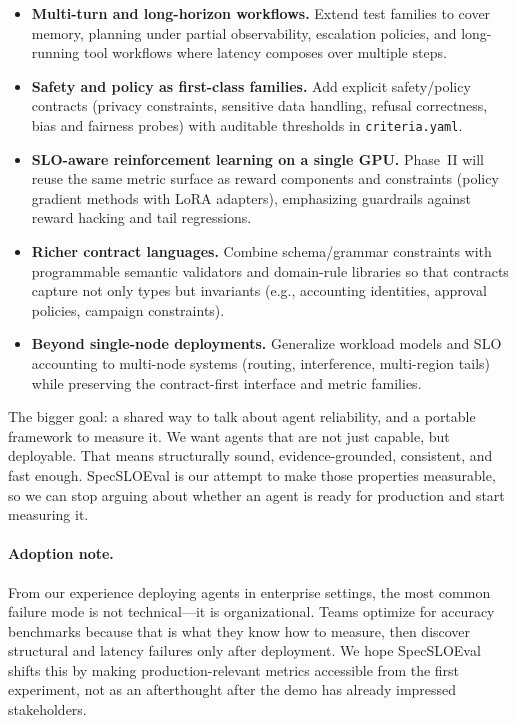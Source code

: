 \documentclass[11pt]{article}
\begin{document}
\begin{itemize}[leftmargin=12pt]
    \item \textbf{Multi-turn and long-horizon workflows.}
    Extend test families to cover memory, planning under partial observability, escalation policies, and long-running tool workflows where latency composes over multiple steps.

    \item \textbf{Safety and policy as first-class families.}
    Add explicit safety/policy contracts (privacy constraints, sensitive data handling, refusal correctness, bias and fairness probes) with auditable thresholds in \texttt{criteria.yaml}.

    \item \textbf{SLO-aware reinforcement learning on a single GPU.}
    Phase~II will reuse the same metric surface as reward components and constraints (policy gradient methods with LoRA adapters), emphasizing guardrails against reward hacking and tail regressions.

    \item \textbf{Richer contract languages.}
    Combine schema/grammar constraints with programmable semantic validators and domain-rule libraries so that contracts capture not only types but invariants (e.g., accounting identities, approval policies, campaign constraints).

    \item \textbf{Beyond single-node deployments.}
    Generalize workload models and SLO accounting to multi-node systems (routing, interference, multi-region tails) while preserving the contract-first interface and metric families.
\end{itemize}

The bigger goal: a shared way to talk about agent reliability, and a portable framework to measure it.
We want agents that are not just capable, but deployable.
That means structurally sound, evidence-grounded, consistent, and fast enough.
SpecSLOEval is our attempt to make those properties measurable, so we can stop arguing about whether an agent is ready for production and start measuring it.

\paragraph{Adoption note.}
From our experience deploying agents in enterprise settings, the most common failure mode is not technical---it is organizational.
Teams optimize for accuracy benchmarks because that is what they know how to measure, then discover structural and latency failures only after deployment.
We hope SpecSLOEval shifts this by making production-relevant metrics accessible from the first experiment, not as an afterthought after the demo has already impressed stakeholders.

\printbibliography
\end{document}
